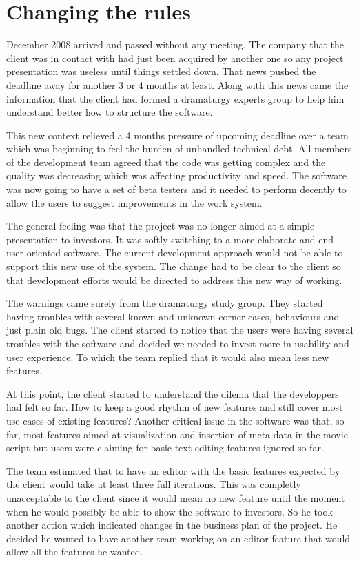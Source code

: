 \documentclass[lnbip]{svmultln}
\begin{document}
\section{Changing the rules}
\label{sec:changes}

December 2008 arrived and passed without any meeting. The company that
the client was in contact with had just been acquired by another one
so any project presentation was useless until things settled
down. That news pushed the deadline away for another 3 or 4 months at
least. Along with this news came the information that the client had
formed a dramaturgy experts group to help him understand better how to
structure the software.

This new context relieved a 4 months pressure of upcoming deadline
over a team which was beginning to feel the burden of unhandled
technical debt. All members of the development team agreed that the
code was getting complex and the quality was decreasing which was
affecting productivity and speed. The software was now going to have a
set of beta testers and it needed to perform decently to allow the
users to suggest improvements in the work system.

The general feeling was that the project was no longer aimed at a
simple presentation to investors. It was softly switching to a more
elaborate and end user oriented software. The current development
approach would not be able to support this new use of the system. The
change had to be clear to the client so that development efforts would
be directed to address this new way of working.

The warnings came surely from the dramaturgy study group. They started
having troubles with several known and unknown corner cases,
behaviours and just plain old bugs. The client started to notice that
the users were having several troubles with the software and decided
we needed to invest more in usability and user experience. To which
the team replied that it would also mean less new features.

At this point, the client started to understand the dilema that the
developpers had felt so far. How to keep a good rhythm of new features
and still cover most use cases of existing features? Another critical
issue in the software was that, so far, most features aimed at
visualization and insertion of meta data in the movie script but users
were claiming for basic text editing features ignored so far.

The team estimated that to have an editor with the basic features
expected by the client would take at least three full iterations. This
was completly unacceptable to the client since it would mean no new
feature until the moment when he would possibly be able to show the
software to investors. So he took another action which indicated
changes in the business plan of the project. He decided he wanted to
have another team working on an editor feature that would allow all
the features he wanted.
\end{document}

